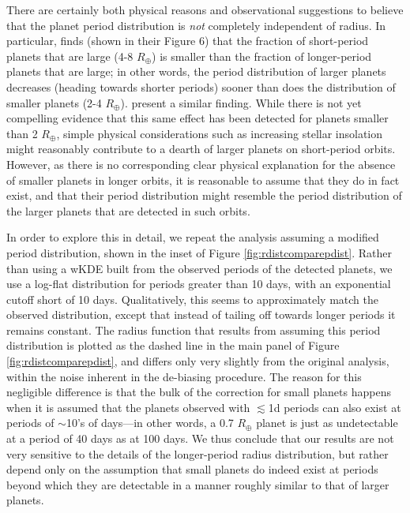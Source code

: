 \documentclass[iop]{emulateapj}
\def\Rearth{R_\oplus}
\begin{document}
There are certainly both physical reasons and observational suggestions to believe that the planet period distribution is \emph{not} completely independent of radius.  In particular, \citet{howard2012} finds (shown in their Figure 6) that the fraction of short-period planets that are large (4-8 $\Rearth$) is smaller than the fraction of longer-period planets that are large; in other words, the period distribution of larger planets decreases (heading towards shorter periods) sooner than does the distribution of smaller planets (2-4 $\Rearth$).  \citet{dong2012} present a similar finding.  While there is not yet compelling evidence that this same effect has been detected for planets smaller than 2 $\Rearth$, simple physical considerations such as increasing stellar insolation \citep{weiss2013} might reasonably contribute to a dearth of larger planets on short-period orbits.   However, as there is no corresponding clear physical explanation for the absence of smaller planets in longer orbits, it is reasonable to assume that they do in fact exist, and that their period distribution might resemble the period distribution of the larger planets that are detected in such orbits. 



In order to explore this in detail, we repeat the analysis assuming a modified period distribution, shown in the inset of Figure \ref{fig:rdistcomparepdist}.  Rather than using a wKDE built from the observed periods of the detected planets, we use a log-flat distribution for periods greater than 10 days, with an exponential cutoff short of 10 days.  Qualitatively, this seems to approximately match the observed distribution, except that instead of tailing off towards longer periods it remains constant.  The radius function that results from assuming this period distribution is plotted as the dashed line in the main panel of Figure \ref{fig:rdistcomparepdist}, and differs only very slightly from the original analysis, within the noise inherent in the de-biasing procedure.  The reason for this negligible difference is that the bulk of the correction for small planets happens when it is assumed that the planets observed with $\lesssim$1d periods can also exist at periods of $\sim$10's of days---in other words, a 0.7 $\Rearth$ planet is just as undetectable at a period of 40 days as at 100 days.  We thus conclude that our results are not very sensitive to the details of the longer-period radius distribution, but rather depend only on the assumption that small planets do indeed exist at periods beyond which they are detectable in a manner roughly similar to that of larger planets.
\end{document}

